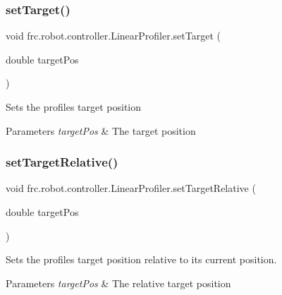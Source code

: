 \subsubsection{\texorpdfstring{setTarget()}{setTarget()}}
{\footnotesize\ttfamily void frc.\+robot.\+controller.\+Linear\+Profiler.\+set\+Target (\begin{DoxyParamCaption}\item[{double}]{target\+Pos }\end{DoxyParamCaption})\hspace{0.3cm}{\ttfamily [inline]}}

Sets the profile\textquotesingle{}s target position


\begin{DoxyParams}{Parameters}
{\em target\+Pos} & The target position \\
\hline
\end{DoxyParams}
\mbox{\label{classfrc_1_1robot_1_1controller_1_1_linear_profiler_adc5f6e012d51900b577649e28782c68c}} 
\subsubsection{\texorpdfstring{setTargetRelative()}{setTargetRelative()}}
{\footnotesize\ttfamily void frc.\+robot.\+controller.\+Linear\+Profiler.\+set\+Target\+Relative (\begin{DoxyParamCaption}\item[{double}]{target\+Pos }\end{DoxyParamCaption})\hspace{0.3cm}{\ttfamily [inline]}}

Sets the profile\textquotesingle{}s target position relative to its current position.


\begin{DoxyParams}{Parameters}
{\em target\+Pos} & The relative target position \\
\hline
\end{DoxyParams}
\mbox{\label{classfrc_1_1robot_1_1controller_1_1_linear_profiler_ab8a903a8ae6c3a3cf6f1f830c0bae628}} 
